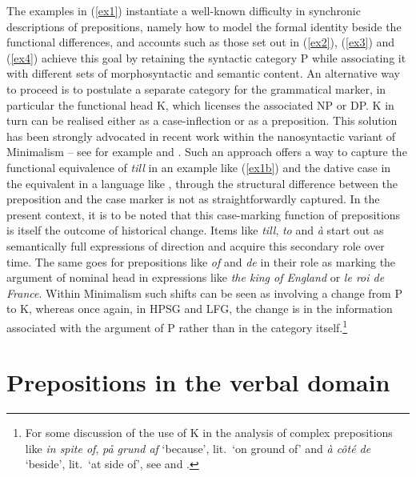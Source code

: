 \documentclass[output=paper]{langsci/langscibook}
\begin{document}
The examples in (\ref{ex1}) instantiate a well-known difficulty in synchronic
descriptions of prepositions, namely how to model the formal identity beside
the functional differences, and accounts such as those set out in (\ref{ex2}),
(\ref{ex3}) and (\ref{ex4}) achieve this goal by retaining the syntactic category P while associating
it with different sets of morphosyntactic and semantic content. An alternative
way to proceed is to postulate a separate category for the grammatical marker,
in particular the functional head K, which licenses the
associated NP or DP. K in turn can be realised either as a case-inflection or
as a preposition. This solution has been strongly advocated in recent work
within the nanosyntactic variant of Minimalism -- see for example
\textcite{Svenonius2008} and \textcite{RoySven09}.  Such an approach offers a
way to capture the functional equivalence of \emph{till} in an example like
(\ref{ex1b}) and the dative case in the equivalent in a
language like , through the structural difference between the
preposition and the case marker is not as straightforwardly captured. In the
present context, it is to be noted that this case-marking function of
prepositions is itself the outcome of historical change. Items like
 \emph{till},  \emph{to} and  \emph{à}
start out as semantically full expressions of direction and acquire this
secondary role over time. The same goes for prepositions like 
\emph{of} and  \emph{de} in their role as marking the argument of
nominal head in expressions like \emph{the king of England} or \emph{le roi de
France}. Within Minimalism such shifts can be seen as involving a change from P
to K, whereas once again, in \gls{HPSG}
and \gls{LFG}, the change is in the information associated with the argument of
P rather than in the category itself.\footnote{For some discussion of the use
    of K in the analysis of complex prepositions like \emph{in spite of},
     \emph{p\aa {} grund af} `because', lit.\ `on ground of'
and  \emph{à c\^ot\'e de} `beside', lit.\ `at side of', see
\textcite{RoySven09} and \textcite{VincInPress}.}

\section{Prepositions in the verbal domain}\label{sec:08.6}
\end{document}
